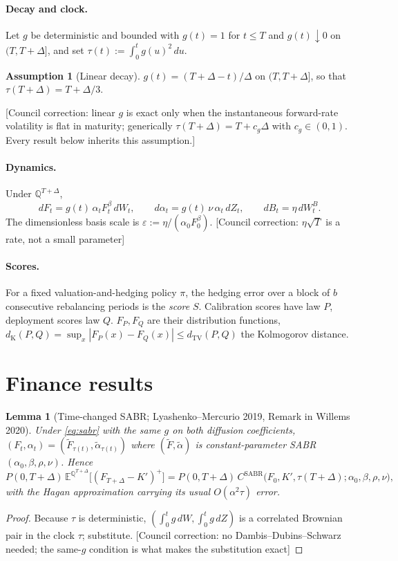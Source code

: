 \documentclass[11pt,a4paper]{article}
\newcommand{\corr}[1]{{\color{ox}\textsf{\small [Council correction: #1]}}}
\theoremstyle{plain}
\newtheorem{lemma}[theorem]{Lemma}
\theoremstyle{definition}
\newtheorem{assumption}{Assumption}
\theoremstyle{remark}
\newcommand{\E}{\mathbb{E}}
\newcommand{\Q}{\mathbb{Q}}
\newcommand{\dTV}{d_{\mathrm{TV}}}
\newcommand{\dK}{d_{\mathrm{K}}}
\begin{document}
\paragraph{Decay and clock.} Let $g$ be deterministic and bounded with $g(t)=1$ for $t\le T$ and $g(t)\downarrow 0$ on $(T,T+\Delta]$, and set $\tau(t):=\int_0^t g(u)^2\,du$.

\begin{assumption}[Linear decay]\label{ass:linear}
$g(t)=(T+\Delta-t)/\Delta$ on $(T,T+\Delta]$, so that $\tau(T+\Delta)=T+\Delta/3$.
\end{assumption}
\corr{linear $g$ is exact only when the instantaneous forward-rate volatility is flat in maturity; generically $\tau(T+\Delta)=T+c_g\Delta$ with $c_g\in(0,1)$. Every result below inherits this assumption.}

\paragraph{Dynamics.} Under $\Q^{T+\Delta}$,
\begin{equation}\label{eq:sabr}
dF_t=g(t)\,\alpha_t F_t^{\beta}\,dW_t,\qquad d\alpha_t=g(t)\,\nu\,\alpha_t\,dZ_t,\qquad dB_t=\eta\,dW^B_t .
\end{equation}
The dimensionless basis scale is $\varepsilon:=\eta/(\alpha_0F_0^{\beta})$. \corr{$\eta\sqrt T$ is a rate, not a small parameter}

\paragraph{Scores.} For a fixed valuation-and-hedging policy $\pi$, the hedging error over a block of $b$ consecutive rebalancing periods is the \emph{score} $S$. Calibration scores have law $P$, deployment scores law $Q$. $F_P,F_Q$ are their distribution functions, $\dK(P,Q)=\sup_x|F_P(x)-F_Q(x)|\le\dTV(P,Q)$ the Kolmogorov distance.

\section{Finance results}

\begin{lemma}[Time-changed SABR; Lyashenko--Mercurio 2019, Remark in Willems 2020]\label{lem:tc}
Under \eqref{eq:sabr} with the same $g$ on both diffusion coefficients, $(F_t,\alpha_t)=(\tilde F_{\tau(t)},\tilde\alpha_{\tau(t)})$ where $(\tilde F,\tilde\alpha)$ is constant-parameter SABR$(\alpha_0,\beta,\rho,\nu)$. Hence
\begin{equation}
P(0,T+\Delta)\,\E^{\Q^{T+\Delta}}\big[(F_{T+\Delta}-K')^+\big]=P(0,T+\Delta)\,C^{\mathrm{SABR}}\big(F_0,K',\tau(T+\Delta);\alpha_0,\beta,\rho,\nu\big),
\end{equation}
with the Hagan approximation carrying its usual $O(\alpha^2\tau)$ error.
\end{lemma}
\begin{proof}
Because $\tau$ is deterministic, $(\int_0^t g\,dW,\int_0^t g\,dZ)$ is a correlated Brownian pair in the clock $\tau$; substitute. \corr{no Dambis--Dubins--Schwarz needed; the same-$g$ condition is what makes the substitution exact}
\end{proof}
\end{document}
